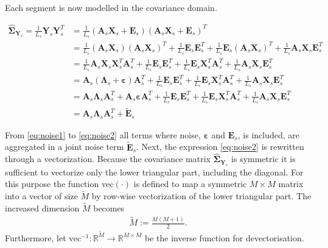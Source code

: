 Each segment is now modelled in the covariance domain.
\begin{widepage}
\begin{align} 
\widehat{\boldsymbol{\Sigma}}_{\mathbf{Y}_s}= \frac{1}{L_s}\mathbf{Y}_s \mathbf{Y}_s^T &=  \frac{1}{L_s}\left( \mathbf{A}_s \mathbf{X}_s + \mathbf{E}_s \right) \left( \mathbf{A}_s \mathbf{X}_s + \mathbf{E}_s\right)^T \nonumber \\ 
&= \frac{1}{L_s} (\textbf{A}_s\textbf{X}_s)(\textbf{A}_s\textbf{X}_s)^T +\frac{1}{L_s}\textbf{E}_s \textbf{E}_s^T + \frac{1}{L_s}\textbf{E}_s (\textbf{A}_s\textbf{X}_s)^T + \frac{1}{L_s}\textbf{A}_s\textbf{X}_s \textbf{E}_s^T  \nonumber \\
&=\frac{1}{L_s} \textbf{A}_s\textbf{X}_s \textbf{X}_s^T \textbf{A}_s^T +\frac{1}{L_s} \textbf{E}_s \textbf{E}_s^T +\frac{1}{L_s} \textbf{E}_s \textbf{X}_s^T \textbf{A}_s^T +\frac{1}{L_s} \textbf{A}_s\textbf{X}_s \textbf{E}_s^T  \nonumber \\
&= \textbf{A}_s(\boldsymbol{\Lambda}_s +\boldsymbol{\varepsilon}) \textbf{A}_s^T +\frac{1}{L_s} \textbf{E}_s \textbf{E}_s^T + \frac{1}{L_s}\textbf{E}_s \textbf{X}_s^T \textbf{A}_s^T + \frac{1}{L_s}\textbf{A}_s\textbf{X}_s \textbf{E}_s^T \nonumber \\
&= \textbf{A}_s \boldsymbol{\Lambda}_s \textbf{A}_s^T + \textbf{A}_s \boldsymbol{\varepsilon} \textbf{A}_s^T + \frac{1}{L_s}\textbf{E}_s \textbf{E}_s^T +\frac{1}{L_s} \textbf{E}_s \textbf{X}_s^T \textbf{A}_s^T + \frac{1}{L_s}\textbf{A}_s\textbf{X}_s \textbf{E}_s^T \label{eq:noise1} \\
&= \textbf{A}_s \boldsymbol{\Lambda}_s \textbf{A}_s^T + \widetilde{\textbf{E}}_s \label{eq:noise2}
\end{align}
\end{widepage}
From \eqref{eq:noise1} to \eqref{eq:noise2} all terms where noise, $\boldsymbol{\varepsilon}$ and $\mathbf{E}_s$, is included, are aggregated in a joint noise term $\widetilde{\textbf{E}}_s$. 
Next, the expression \eqref{eq:noise2} is rewritten through a vectorization. 
Because the covariance matrix $\widehat{\boldsymbol{\Sigma}}_{\mathbf{Y}_s}$ is symmetric it is sufficient to vectorize only the lower triangular part, including the diagonal. 
For this purpose the function $\text{vec}(\cdot)$ is defined to map a symmetric $M \times M$ matrix into a vector of size $\widetilde{M}$ by row-wise vectorization of the lower triangular part. The increased dimension $\widetilde{M}$ becomes 
\begin{align}
\widetilde{M} := \frac{M(M+1)}{2}.
\end{align}
Furthermore, let $\text{vec}^{-1}: \mathbb{R}^{\widetilde{M}} \rightarrow \mathbb{R}^{M\times M}$ be the inverse function for devectorisation. 


